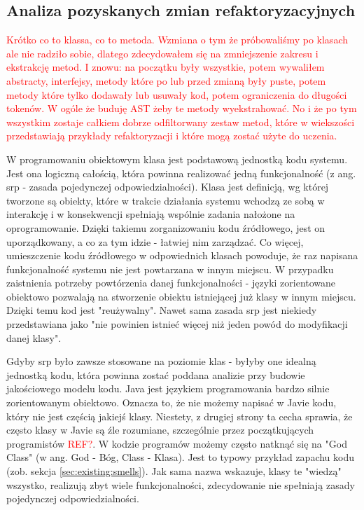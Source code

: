 \documentclass[12pt]{report}
\begin{document}
\subsection{Analiza pozyskanych zmian refaktoryzacyjnych}
\label{sec:impl:analiza-klasy}
\textcolor{red}{Krótko co to klassa, co to metoda. Wzmiana o tym że próbowaliśmy po klasach ale nie radziło sobie, dlatego zdecydowałem się na zmniejszenie zakresu i ekstrakcję metod. I znowu: na początku były wszystkie, potem wywaliłem abstracty, interfejsy, metody które po lub przed zmianą były puste, potem metody które tylko dodawały lub usuwały kod, potem ograniczenia do długości tokenów. W ogóle że buduję AST żeby te metody wyekstrahować. No i że po tym wszystkim zostaje całkiem dobrze odfiltorwany zestaw metod, które w wiekszości przedstawiają przykłady refaktoryzacji i które mogą zostać użyte do uczenia.}

W programowaniu obiektowym klasa jest podstawową jednostką kodu systemu. Jest ona logiczną całością, która powinna realizować jedną funkcjonalność (z ang. \gls{srp} - zasada pojedynczej odpowiedzialności). Klasa jest definicją, wg której tworzone są obiekty, które w trakcie działania systemu wchodzą ze sobą w interakcję i w konsekwencji spełniają wspólnie zadania nałożone na oprogramowanie. Dzięki takiemu zorganizowaniu kodu źródłowego, jest on uporządkowany, a co za tym idzie - łatwiej nim zarządzać. Co więcej, umieszczenie kodu źródłowego w odpowiednich klasach powoduje, że raz napisana funkcjonalność systemu nie jest powtarzana w innym miejscu. W przypadku zaistnienia potrzeby powtórzenia danej funkcjonalności - języki zorientowane obiektowo pozwalają na stworzenie obiektu istniejącej już klasy w innym miejscu. Dzięki temu kod jest "reużywalny". Nawet sama zasada \gls{srp} jest niekiedy przedstawiana jako "nie powinien istnieć więcej niż jeden powód do modyfikacji danej klasy".

Gdyby \gls{srp} było zawsze stosowane na poziomie klas - byłyby one idealną jednostką kodu, która powinna zostać poddana analizie przy budowie jakościowego modelu kodu. Java jest językiem programowania bardzo silnie zorientowanym obiektowo. Oznacza to, że nie możemy napisać w Javie kodu, który nie jest częścią jakiejś klasy. Niestety, z drugiej strony ta cecha sprawia, że często klasy w Javie są źle rozumiane, szczególnie przez początkujących programistów \textcolor{red}{REF?}. W kodzie programów możemy często natknąć się na "God Class" \cite{martin2009clean} (w ang. God - Bóg, Class - Klasa). Jest to typowy przykład zapachu kodu (zob. sekcja \ref{sec:existing:smells}). Jak sama nazwa wskazuje, klasy te "wiedzą" wszystko, realizują zbyt wiele funkcjonalności, zdecydowanie nie spełniają zasady pojedynczej odpowiedzialności. 
\end{document}
